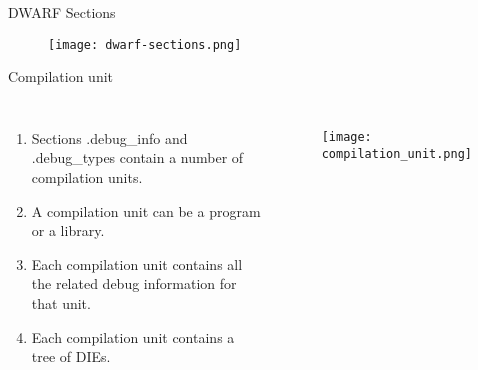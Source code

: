 
\begin{frame}{DWARF Sections}
	\begin{figure}
		\texttt{[image: dwarf-sections.png]}
	\end{figure}
\end{frame}


\begin{frame}{Compilation unit}


    \begin{columns}[c] %

        \begin{enumerate}
		\item Sections .debug\_info and .debug\_types contain a number of compilation units.
		\item A compilation unit can be a program or a library.
		\item Each compilation unit contains all the related debug information for that unit.
		\item Each compilation unit contains a tree of DIEs.
        \end{enumerate}

	\begin{figure}
		\texttt{[image: compilation\_unit.png]}
	\end{figure}

    \end{columns}
\end{frame}



